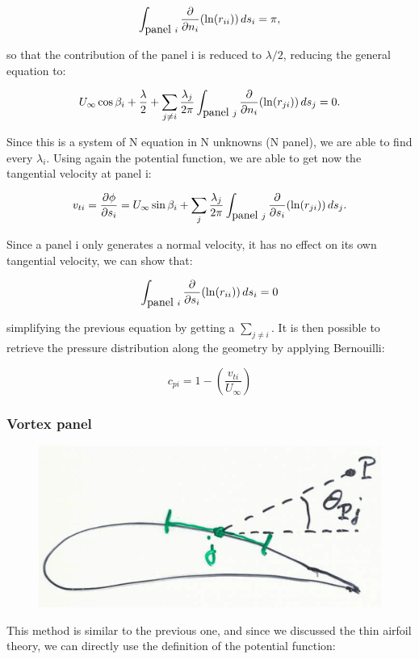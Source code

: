	 \begin{equation}
	 \int _{\mbox{panel }i} \frac{\partial}{\partial n_i} (\ln (r_{ii})) \, ds_i = \pi,
	 \end{equation}
	 
	 so that the contribution of the panel i is reduced to $\lambda /2$, reducing the general equation to: 
	 
	 \begin{equation}
	 U_\infty \cos \beta _i +\frac{\lambda}{2}+ \sum _{j\neq i} \frac{\lambda _j}{2\pi} \int _{\mbox{panel }j} \frac{\partial}{\partial n_i} (\ln (r_{ji})) \, ds_j = 0.
	 \end{equation}
	 
	 Since this is a system of N equation in N unknowns (N panel), we are able to find every $\lambda _i$. Using again the potential function, we are able to get now the tangential velocity at panel i: 
	 
	 \begin{equation}
	 v_{ti} = \frac{\partial \phi}{\partial s_i} = U_\infty \sin \beta _i + \sum _j \frac{\lambda _j}{2\pi} \int _{\mbox{panel }j} \frac{\partial}{\partial s_i} (\ln (r_{ji})) \, ds_j .
	 \end{equation}
	 
	 Since a panel i only generates a normal velocity, it has no effect on its own tangential velocity, we can show that: 
	 
	 \begin{equation}
	 \int _{\mbox{panel }i} \frac{\partial}{\partial s_i} (\ln (r_{ii})) \, ds_i = 0 
	 \end{equation}
	 
	 simplifying the previous equation by getting a $\sum _{j\neq i}$. It is then possible to retrieve the pressure distribution along the geometry by applying Bernouilli: 
	 
	 \begin{equation}
	 c_{pi} = 1- \left(\frac{v_{ti}}{U_\infty} \right)
	 \end{equation}
	 
\subsubsection{Vortex panel}
	\begin{figure}
	\vspace{-5mm}
	\includegraphics[scale=0.1]{ch2/42}
	\end{figure}
	This method is similar to the previous one, and since we discussed the thin airfoil theory, we can directly use the definition of the potential function:
	
